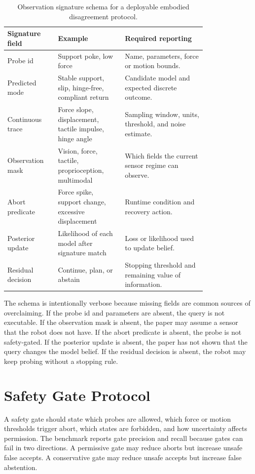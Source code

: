 \documentclass{article}
\begin{document}
\begin{table}[p]
\centering
\small
\begin{tabular}{p{0.18\linewidth}p{0.28\linewidth}p{0.34\linewidth}}
\toprule
Signature field & Example & Required reporting \\
\midrule
Probe id & Support poke, low force & Name, parameters, force or motion bounds. \\
Predicted mode & Stable support, slip, hinge-free, compliant return & Candidate model and expected discrete outcome. \\
Continuous trace & Force slope, displacement, tactile impulse, hinge angle & Sampling window, units, threshold, and noise estimate. \\
Observation mask & Vision, force, tactile, proprioception, multimodal & Which fields the current sensor regime can observe. \\
Abort predicate & Force spike, support change, excessive displacement & Runtime condition and recovery action. \\
Posterior update & Likelihood of each model after signature match & Loss or likelihood used to update belief. \\
Residual decision & Continue, plan, or abstain & Stopping threshold and remaining value of information. \\
\bottomrule
\end{tabular}
\caption{Observation signature schema for a deployable embodied disagreement protocol.}
\label{tab:signature_schema}
\end{table}

The schema is intentionally verbose because missing fields are common sources of overclaiming. If the probe id and parameters are absent, the query is not executable. If the observation mask is absent, the paper may assume a sensor that the robot does not have. If the abort predicate is absent, the probe is not safety-gated. If the posterior update is absent, the paper has not shown that the query changes the model belief. If the residual decision is absent, the robot may keep probing without a stopping rule.

\section{Safety Gate Protocol}

A safety gate should state which probes are allowed, which force or motion thresholds trigger abort, which states are forbidden, and how uncertainty affects permission. The benchmark reports gate precision and recall because gates can fail in two directions. A permissive gate may reduce aborts but increase unsafe false accepts. A conservative gate may reduce unsafe accepts but increase false abstention.
\end{document}
